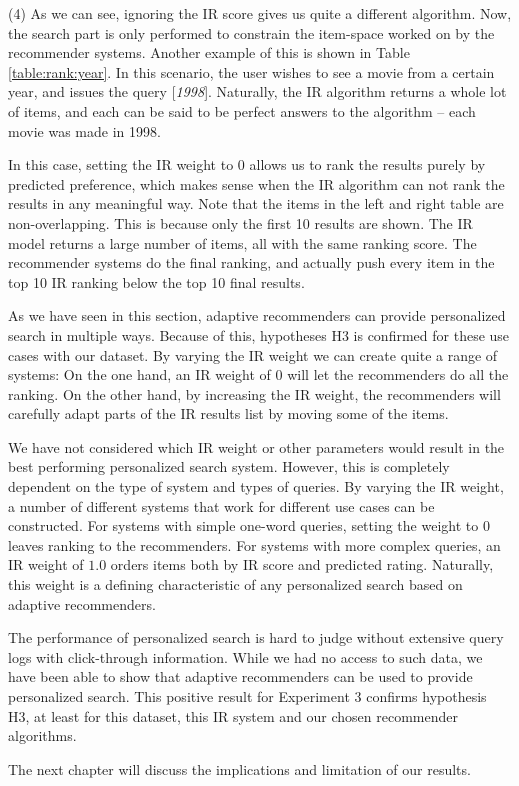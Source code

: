 (4) As we can see, ignoring the IR score gives us quite a different algorithm.
Now, the search part is only performed to constrain the item-space worked
on by the recommender systems.
Another example of this is shown in Table \ref{table:rank:year}.
In this scenario, the user wishes to see a movie from a certain year,
and issues the query [\emph{1998}].
Naturally, the IR algorithm returns a whole lot of items, and each can
be said to be perfect answers to the algorithm -- each movie
was made in 1998.

In this case, setting the IR weight to $0$ allows us to rank the results
purely by predicted preference, which makes sense when the IR algorithm
can not rank the results in any meaningful way.
Note that the items in the left and right table are non-overlapping.
This is because only the first 10 results are shown.
The IR model returns a large number of items,
all with the same ranking score.
The recommender systems do the final ranking, and actually
push every item in the top 10 IR ranking 
below the top 10 final results.



As we have seen in this section, adaptive recommenders can provide personalized search
in multiple ways. 
Because of this, hypotheses H3 is confirmed for these use cases with our dataset.
By varying the IR weight we can create quite a range of systems:
On the one hand, an IR weight of 0 will let the recommenders do all the ranking.
On the other hand, by increasing the IR weight, the recommenders will carefully
adapt parts of the IR results list by moving some of the items.



We have not considered which IR weight or other parameters would result in the best performing
personalized search system.
However, this is completely dependent on the type of system and types of queries.
By varying the IR weight, a number of different systems that work for different use cases
can be constructed. For systems with simple one-word queries, setting the weight
to $0$ leaves ranking to the recommenders.
For systems with more complex queries, an IR weight of $1.0$ 
orders items both by IR score and predicted rating.
Naturally, this weight is a defining characteristic of any 
personalized search based on adaptive recommenders.

The performance of personalized search is hard to judge without
extensive query logs with click-through information.
While we had no access to such data, 
we have been able to show that adaptive recommenders
can be used to provide personalized search.
This positive result for Experiment 3 confirms hypothesis H3,
at least for this dataset, this IR system and our chosen recommender algorithms.

The next chapter will discuss the implications and limitation of our results.

